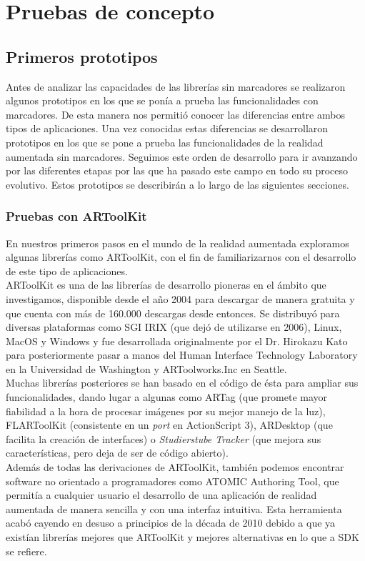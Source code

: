 \chapter{Pruebas de concepto}

\section{Primeros prototipos}
Antes de analizar las capacidades de las librerías sin marcadores se realizaron algunos prototipos en los que se ponía a prueba las funcionalidades con marcadores. De esta manera nos permitió conocer las diferencias entre ambos tipos de aplicaciones. Una vez conocidas estas diferencias se desarrollaron prototipos en los que se pone a prueba las funcionalidades de la realidad aumentada sin marcadores. Seguimos este orden de desarrollo para ir avanzando por las diferentes etapas por las que ha pasado este campo en todo su proceso evolutivo. Estos prototipos se describirán a lo largo de las siguientes secciones.

\subsection{Pruebas con ARToolKit}
En nuestros primeros pasos en el mundo de la realidad aumentada exploramos algunas librerías como ARToolKit, con el fin de familiarizarnos con el desarrollo de este tipo de aplicaciones.\\

ARToolKit es una de las librerías de desarrollo pioneras en el ámbito que investigamos, disponible desde el año 2004 para descargar de manera gratuita y que cuenta con más de 160.000 descargas desde entonces. Se distribuyó para diversas plataformas como SGI IRIX (que dejó de utilizarse en 2006), Linux, MacOS y Windows y fue desarrollada originalmente por el Dr. Hirokazu Kato para posteriormente pasar a manos del Human Interface Technology Laboratory en la Universidad de Washington y ARToolworks.Inc en Seattle.\\

Muchas librerías posteriores se han basado en el código de ésta para ampliar sus funcionalidades, dando lugar a algunas como ARTag (que promete mayor fiabilidad a la hora de procesar imágenes por su mejor manejo de la luz), FLARToolKit (consistente en un \textit{port} en ActionScript 3), ARDesktop (que facilita la creación de interfaces) o\textit{ Studierstube Tracker} (que mejora sus características, pero deja de ser de código abierto).\\
Además de todas las derivaciones de ARToolKit, también podemos encontrar software no orientado a programadores como ATOMIC Authoring Tool, que permitía a cualquier usuario el desarrollo de una aplicación de realidad aumentada de manera sencilla y con una interfaz intuitiva. Esta herramienta acabó cayendo en desuso a principios de la década de 2010 debido a que ya existían librerías mejores que ARToolKit y mejores alternativas en lo que a SDK se refiere.\\


